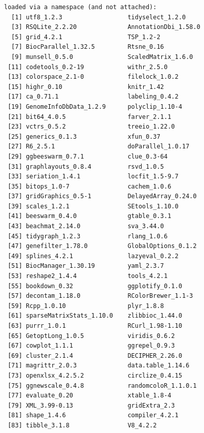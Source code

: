 \documentclass[
]{book}
\begin{document}
\begin{verbatim}
loaded via a namespace (and not attached):
  [1] utf8_1.2.3                  tidyselect_1.2.0           
  [3] RSQLite_2.2.20              AnnotationDbi_1.58.0       
  [5] grid_4.2.1                  TSP_1.2-2                  
  [7] BiocParallel_1.32.5         Rtsne_0.16                 
  [9] munsell_0.5.0               ScaledMatrix_1.6.0         
 [11] codetools_0.2-19            withr_2.5.0                
 [13] colorspace_2.1-0            filelock_1.0.2             
 [15] highr_0.10                  knitr_1.42                 
 [17] ca_0.71.1                   labeling_0.4.2             
 [19] GenomeInfoDbData_1.2.9      polyclip_1.10-4            
 [21] bit64_4.0.5                 farver_2.1.1               
 [23] vctrs_0.5.2                 treeio_1.22.0              
 [25] generics_0.1.3              xfun_0.37                  
 [27] R6_2.5.1                    doParallel_1.0.17          
 [29] ggbeeswarm_0.7.1            clue_0.3-64                
 [31] graphlayouts_0.8.4          rsvd_1.0.5                 
 [33] seriation_1.4.1             locfit_1.5-9.7             
 [35] bitops_1.0-7                cachem_1.0.6               
 [37] gridGraphics_0.5-1          DelayedArray_0.24.0        
 [39] scales_1.2.1                SEtools_1.10.0             
 [41] beeswarm_0.4.0              gtable_0.3.1               
 [43] beachmat_2.14.0             sva_3.44.0                 
 [45] tidygraph_1.2.3             rlang_1.0.6                
 [47] genefilter_1.78.0           GlobalOptions_0.1.2        
 [49] splines_4.2.1               lazyeval_0.2.2             
 [51] BiocManager_1.30.19         yaml_2.3.7                 
 [53] reshape2_1.4.4              tools_4.2.1                
 [55] bookdown_0.32               ggplotify_0.1.0            
 [57] decontam_1.18.0             RColorBrewer_1.1-3         
 [59] Rcpp_1.0.10                 plyr_1.8.8                 
 [61] sparseMatrixStats_1.10.0    zlibbioc_1.44.0            
 [63] purrr_1.0.1                 RCurl_1.98-1.10            
 [65] GetoptLong_1.0.5            viridis_0.6.2              
 [67] cowplot_1.1.1               ggrepel_0.9.3              
 [69] cluster_2.1.4               DECIPHER_2.26.0            
 [71] magrittr_2.0.3              data.table_1.14.6          
 [73] openxlsx_4.2.5.2            circlize_0.4.15            
 [75] ggnewscale_0.4.8            randomcoloR_1.1.0.1        
 [77] evaluate_0.20               xtable_1.8-4               
 [79] XML_3.99-0.13               gridExtra_2.3              
 [81] shape_1.4.6                 compiler_4.2.1             
 [83] tibble_3.1.8                V8_4.2.2                   

\end{verbatim}
\end{document}
